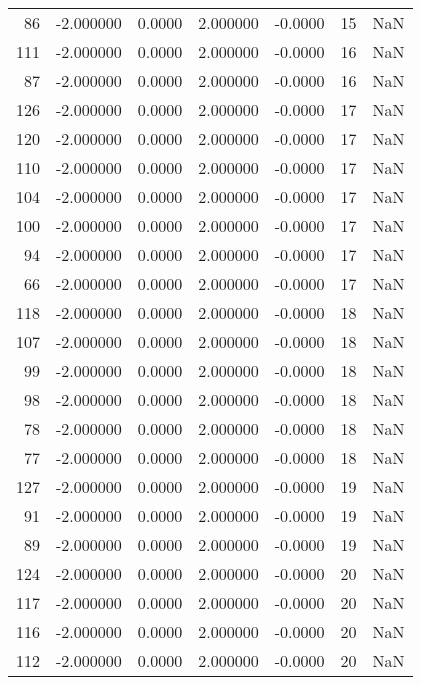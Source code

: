 \begin{tabular}{rrrrrrr}
 86 & -2.000000 &   0.0000 &  2.000000 &     -0.0000 &          15 & NaN \\
111 & -2.000000 &   0.0000 &  2.000000 &     -0.0000 &          16 & NaN \\
 87 & -2.000000 &   0.0000 &  2.000000 &     -0.0000 &          16 & NaN \\
126 & -2.000000 &   0.0000 &  2.000000 &     -0.0000 &          17 & NaN \\
120 & -2.000000 &   0.0000 &  2.000000 &     -0.0000 &          17 & NaN \\
110 & -2.000000 &   0.0000 &  2.000000 &     -0.0000 &          17 & NaN \\
104 & -2.000000 &   0.0000 &  2.000000 &     -0.0000 &          17 & NaN \\
100 & -2.000000 &   0.0000 &  2.000000 &     -0.0000 &          17 & NaN \\
 94 & -2.000000 &   0.0000 &  2.000000 &     -0.0000 &          17 & NaN \\
 66 & -2.000000 &   0.0000 &  2.000000 &     -0.0000 &          17 & NaN \\
118 & -2.000000 &   0.0000 &  2.000000 &     -0.0000 &          18 & NaN \\
107 & -2.000000 &   0.0000 &  2.000000 &     -0.0000 &          18 & NaN \\
 99 & -2.000000 &   0.0000 &  2.000000 &     -0.0000 &          18 & NaN \\
 98 & -2.000000 &   0.0000 &  2.000000 &     -0.0000 &          18 & NaN \\
 78 & -2.000000 &   0.0000 &  2.000000 &     -0.0000 &          18 & NaN \\
 77 & -2.000000 &   0.0000 &  2.000000 &     -0.0000 &          18 & NaN \\
127 & -2.000000 &   0.0000 &  2.000000 &     -0.0000 &          19 & NaN \\
 91 & -2.000000 &   0.0000 &  2.000000 &     -0.0000 &          19 & NaN \\
 89 & -2.000000 &   0.0000 &  2.000000 &     -0.0000 &          19 & NaN \\
124 & -2.000000 &   0.0000 &  2.000000 &     -0.0000 &          20 & NaN \\
117 & -2.000000 &   0.0000 &  2.000000 &     -0.0000 &          20 & NaN \\
116 & -2.000000 &   0.0000 &  2.000000 &     -0.0000 &          20 & NaN \\
112 & -2.000000 &   0.0000 &  2.000000 &     -0.0000 &          20 & NaN \\

\end{tabular}
